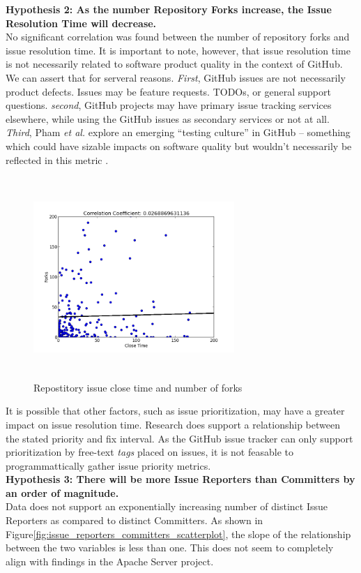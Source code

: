 \documentclass{proc}
\begin{document}
\textbf{Hypothesis 2: As the number Repository Forks increase, the Issue Resolution Time will decrease.}\\
No significant correlation was found between the number of repository forks and issue resolution time. It is important to note, however, that issue resolution time is not necessarily related to software product quality in the context of GitHub. We can assert that for serveral reasons. \textit{First}, GitHub issues are not necessarily product defects. Issues may be feature requests. TODOs, or general support questions. \textit{second}, GitHub projects may have primary issue tracking services elsewhere, while using the GitHub issues as secondary services or not at all. \textit{Third}, Pham \textit{et al.} explore an emerging ``testing culture'' in GitHub -- something which could have sizable impacts on software quality but wouldn't necessarily be reflected in this metric \cite{phamcreating}.

\begin{figure}
\includegraphics[height=3in,width=3in]{images/issue_close_time_forks_scatterplot.png}
\caption{Repostitory issue close time and number of forks}
\label{fig:issue_close_time_forks_scatterplot}
\end{figure}

It is possible that other factors, such as issue prioritization, may have a greater impact on issue resolution time. Research does support a relationship\cite{mockus2002two} between the stated priority and fix interval. As the GitHub issue tracker can only support prioritization by free-text \textit{tags} placed on issues, it is not feasable to programmattically gather issue priority metrics.\\

\textbf{Hypothesis 3: There will be more Issue Reporters than Committers by an order of magnitude.}\\
Data does not support an exponentially increasing number of distinct Issue Reporters as compared to distinct Committers. 
As shown in Figure\ref{fig:issue_reporters_committers_scatterplot}, the slope of the relationship between the two variables is less than one. This does not seem to completely align with findings in the Apache Server project\cite{mockus2000case}. 
\end{document}
